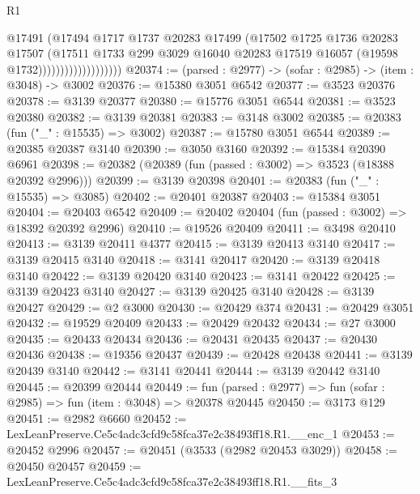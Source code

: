 \begin{lexlean}{R1}
\begin{coremodule}
                                  @17491
                                  (@17494
                                    @1717
                                    @1737
                                    @20283
                                    @17499
                                    (@17502
                                      @1725
                                      @1736
                                      @20283
                                      @17507
                                      (@17511
                                        @1733
                                        @299
                                        @3029
                                        @16040
                                        @20283
                                        @17519
                                        @16057
                                        (@19598 @1732)))))))))))))))))))
@20374 := (parsed : @2977) -> (sofar : @2985) -> (item : @3048) -> @3002
@20376 := @15380 @3051 @6542
@20377 := @3523 @20376
@20378 := @3139 @20377
@20380 := @15776 @3051 @6544
@20381 := @3523 @20380
@20382 := @3139 @20381
@20383 := @3148 @3002
@20385 := @20383 (fun ("_" : @15535) => @3002)
@20387 := @15780 @3051 @6544
@20389 := @20385 @20387 @3140
@20390 := @3050 @3160
@20392 := @15384 @20390 @6961
@20398 := @20382 (@20389 (fun (passed : @3002) => @3523 (@18388 @20392 @2996)))
@20399 := @3139 @20398
@20401 := @20383 (fun ("_" : @15535) => @3085)
@20402 := @20401 @20387
@20403 := @15384 @3051
@20404 := @20403 @6542
@20409 := @20402 @20404 (fun (passed : @3002) => @18392 @20392 @2996)
@20410 := @19526 @20409
@20411 := @3498 @20410
@20413 := @3139 @20411 @4377
@20415 := @3139 @20413 @3140
@20417 := @3139 @20415 @3140
@20418 := @3141 @20417
@20420 := @3139 @20418 @3140
@20422 := @3139 @20420 @3140
@20423 := @3141 @20422
@20425 := @3139 @20423 @3140
@20427 := @3139 @20425 @3140
@20428 := @3139 @20427
@20429 := @2 @3000
@20430 := @20429 @374
@20431 := @20429 @3051
@20432 := @19529 @20409
@20433 := @20429 @20432
@20434 := @27 @3000
@20435 := @20433 @20434
@20436 := @20431 @20435
@20437 := @20430 @20436
@20438 := @19356 @20437
@20439 := @20428 @20438
@20441 := @3139 @20439 @3140
@20442 := @3141 @20441
@20444 := @3139 @20442 @3140
@20445 := @20399 @20444
@20449 := fun (parsed : @2977) => fun (sofar : @2985) => fun (item : @3048) => @20378 @20445
@20450 := @3173 @129
@20451 := @2982 @6660
@20452 := LexLeanPreserve.Ce5c4adc3cfd9c58fca37e2c38493ff18.R1.__enc_1
@20453 := @20452 @2996
@20457 := @20451 (@3533 (@2982 @20453 @3029))
@20458 := @20450 @20457
@20459 := LexLeanPreserve.Ce5c4adc3cfd9c58fca37e2c38493ff18.R1.__fits_3

\end{coremodule}
\end{lexlean}

